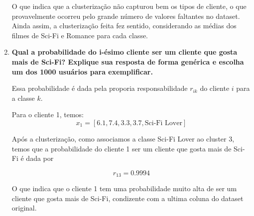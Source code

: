 \begin{enumerate}
\begin{tcolorbox}[title=Resposta:]
        O que indica que a clusterização não capturou bem os tipos de cliente, o que provavelmente ocorreu pelo grande número de valores faltantes no dataset. Ainda assim, a clusterização feita fez sentido, considerando as médias dos filmes de Sci-Fi e Romance para cada classe.

    \end{tcolorbox}
    \newpage
    \item \textbf{Qual a probabilidade do i-ésimo cliente ser um cliente que gosta mais de Sci-Fi? Explique sua resposta de forma genérica e escolha um dos 1000 usuários para exemplificar.}
    \begin{tcolorbox}[title=Resposta:]
        Essa probabilidade é dada pela proporia responsabilidade $r_{ik}$ do cliente $i$ para a classe $k$.

        Para o cliente 1, temos:
        $$ x_1 = [6.1, 7.4, 3.3, 3.7, \text{Sci-Fi Lover}] $$

        Após a clusterização, como associamos a classe Sci-Fi Lover ao cluster 3, temos que a probabilidade do cliente 1 ser um cliente que gosta mais de Sci-Fi é dada por

        $$ r_{13} = 0.9994$$

        O que indica que o cliente 1 tem uma probabilidade muito alta de ser um cliente que gosta mais de Sci-Fi, condizente com a ultima coluna do dataset original.
    \end{tcolorbox}
\end{enumerate}


